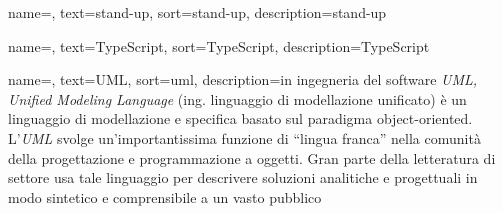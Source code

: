 {
    name=,
    text=stand-up,
    sort=stand-up,
    description={stand-up}
}

{
    name=,
    text=TypeScript,
    sort=TypeScript,
    description={TypeScript}
}

{
    name=,
    text=UML,
    sort=uml,
    description={in ingegneria del software \emph{UML, Unified Modeling Language} (ing. linguaggio di modellazione unificato) è un linguaggio di modellazione e specifica basato sul paradigma object-oriented. L'\emph{UML} svolge un'importantissima funzione di ``lingua franca'' nella comunità della progettazione e programmazione a oggetti. Gran parte della letteratura di settore usa tale linguaggio per descrivere soluzioni analitiche e progettuali in modo sintetico e comprensibile a un vasto pubblico}
}
